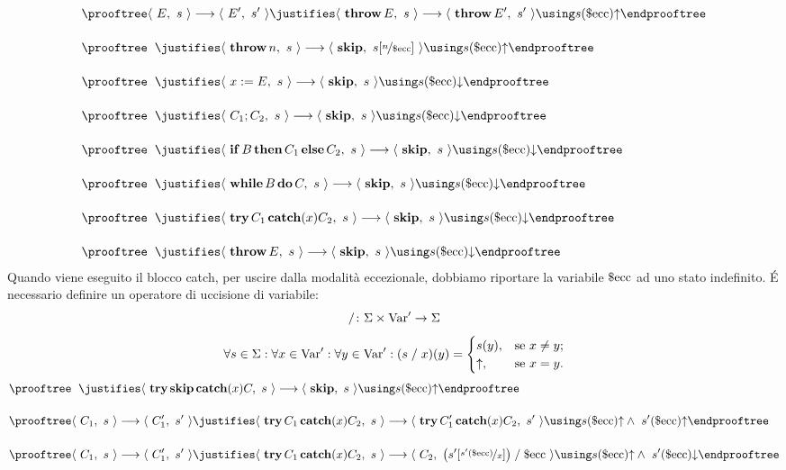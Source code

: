\begin{align*}
  &\prooftree \config{E}{s} \ssarrow \config{E'}{s'}
  \justifies \config{\kw{throw} E}{s} \ssarrow
    \config{\kw{throw} E'}{s'}
  \using s(\ecc) \divrg
  \endprooftree
  \pts
  &\prooftree
  \nohyp
  \justifies \config{\kw{throw} n}{s} \ssarrow
    \config{\kw{skip}}{s \substt{n}{\ecc}}
  \using s(\ecc) \divrg
  \endprooftree
  \pts
  &\prooftree
  \nohyp
  \justifies \config{x \weq E}{s} \ssarrow \config{\kw{skip}}{s}
  \using s(\ecc) \convrg
  \endprooftree
  \pts
  &\prooftree
  \nohyp
  \justifies \config{C_1 ; C_2}{s} \ssarrow \config{\kw{skip}}{s}
  \using s(\ecc) \convrg
  \endprooftree
  \pts
  &\prooftree
  \nohyp
  \justifies \config{\kw{if} B \kw{then} C_1 \kw{else} C_2}{s}
    \ssarrow \config{\kw{skip}}{s}
  \using s(\ecc) \convrg
  \endprooftree
  \pts
  &\prooftree
  \nohyp
  \justifies \config{\kw{while} B \kw{do} C}{s}
     \ssarrow \config{\kw{skip}}{s}
  \using s(\ecc) \convrg
  \endprooftree
  \pts
  &\prooftree
  \nohyp
  \justifies \config{\kw{try} C_1 \kw{catch}(x) C_2}{s}
     \ssarrow \config{\kw{skip}}{s}
  \using s(\ecc) \convrg
  \endprooftree
  \pts
  &\prooftree
  \nohyp
  \justifies \config{\kw{throw} E}{s} \ssarrow \config{\kw{skip}}{s}
  \using s(\ecc) \convrg
  \endprooftree
\end{align*}
Quando viene eseguito il blocco catch, per uscire dalla modalità
eccezionale, dobbiamo riportare la variabile $\mathrm{\$ecc}$ ad uno stato
indefinito. \'E necessario definire un operatore di
uccisione di variabile:
\[
  \mathord{\mathrel{/}}\colon\Sigma \times \mathrm{Var}'\to\Sigma
\]
\[
  \forall s \in \Sigma \mathrel{:} \forall x \in \mathrm{Var}' \mathrel{:}
    \forall y \in \mathrm{Var}' \mathrel{:} (s \mathrel{/} x)(y) = \begin{cases}
        s(y),   &\text{se $x \neq y$;} \\
        \mathord{\uparrow}, &\text{se $x = y$.}
      \end{cases}
\]
\begin{align*}
  &\prooftree
  \nohyp
  \justifies \config{\kw{try} \kw{skip} \kw{catch}(x) C}{s} \ssarrow
    \config{\kw{skip}}{s}
  \using s(\ecc) \divrg
  \endprooftree
  \pts
  &\prooftree \config{C_1}{s} \ssarrow \config{C_1'}{s'}
  \justifies \config{\kw{try} C_1 \kw{catch}(x) C_2}{s} \ssarrow
    \config{\kw{try} C_1' \kw{catch}(x) C_2}{s'}
  \using s(\ecc) \divrg \land\ s'(\ecc) \divrg
  \endprooftree
  \pts
  &\prooftree \config{C_1}{s} \ssarrow \config{C_1'}{s'}
  \justifies \config{\kw{try} C_1 \kw{catch}(x) C_2}{s} \ssarrow
    \config{C_2}{\bigl(s'\substt{s'(\ecc)}{x}\bigr) \unvar \ecc}
  \using s(\ecc) \divrg \land\ s'(\ecc) \convrg
  \endprooftree
\end{align*}

